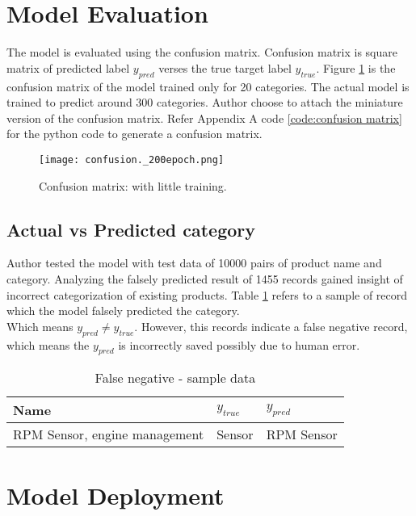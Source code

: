 \section{Model Evaluation}

The model is evaluated using the confusion matrix. Confusion matrix is square matrix of predicted label $y_{pred}$ verses the true target label $y_{true}$.
Figure \ref{fig:meval} is the confusion matrix of the model trained only for 20 categories. The actual model is trained to predict around 300 categories. Author choose to attach the miniature version of the confusion matrix.  Refer Appendix A code \ref{code:confusion matrix} for the python code to generate a confusion matrix.

\begin{figure}[H]
    \centering    
    \texttt{[image: confusion.\_200epoch.png]}
    \caption{Confusion matrix: with little training.
    }
    \label{fig:meval}
\end{figure}

\subsection*{Actual vs Predicted category}
Author tested the model with test data of 10000 pairs of product name and category.
Analyzing the falsely predicted result of 1455 records gained insight of incorrect categorization of existing products.  Table \ref{table:false_negative} refers to a sample of record which the model falsely predicted the category.\\ Which means  $y_{pred} \neq y_{true}$. However, this records indicate a false negative record, which means the $y_{pred}$ is incorrectly saved possibly due to human error. 

     
\begin{table}[h]
    \centering
    \caption{False negative - sample data}
    \label{table:false_negative}
    \begin{tabular}{ lll }
          \toprule
          
          \textbf{Name} & \textbf{$y_{true}$} & \textbf{$y_{pred}$} \\
          \midrule
          RPM Sensor, engine management&Sensor&RPM Sensor \\
        
          \bottomrule
          \end{tabular}
\end{table}

\section{Model Deployment}

